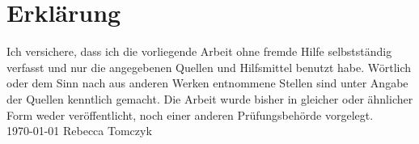 \documentclass[a4paper,titlepage,DIV11,11pt,BCOR2.5cm,headinclude,ngerman,openany,pdftex]{article}
\begin{document}






\tableofcontents
\newpage
{}





%




\printbibliography[
heading=bibintoc,
title={Bibliographie}
]

\section*{Erklärung}
Ich versichere, dass ich die vorliegende Arbeit ohne fremde Hilfe
selbstständig verfasst und nur die angegebenen Quellen und
Hilfsmittel benutzt habe. Wörtlich oder dem Sinn nach aus anderen
Werken entnommene Stellen sind unter Angabe der Quellen kenntlich
gemacht. Die Arbeit wurde bisher in gleicher oder ähnlicher Form
weder veröffentlicht, noch einer anderen Prüfungsbehörde vorgelegt.
 \\[14cm]

\today \hspace{5.3cm} Rebecca Tomczyk
\end{document}
